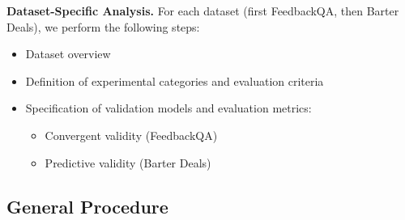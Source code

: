 \vspace{1em}
\noindent \textbf{Dataset-Specific Analysis.}
For each dataset (first FeedbackQA, then Barter Deals), we perform the following steps:
\begin{itemize}[label=\textbullet]
    \item Dataset overview
    \item Definition of experimental categories and evaluation criteria
    \item Specification of validation models and evaluation metrics:
    \begin{itemize}
        \item Convergent validity (FeedbackQA)
        \item Predictive validity (Barter Deals)
    \end{itemize}
\end{itemize}





\subsection{General Procedure}

